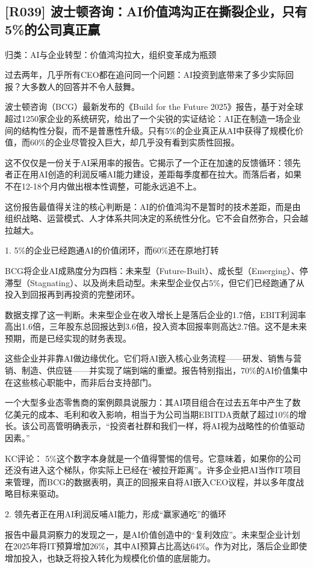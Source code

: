 \documentclass[11pt]{ctexart}
\begin{document}
\subsection{[R039] 波士顿咨询：AI价值鸿沟正在撕裂企业，只有5\%的公司真正赢}
{\small\color{refgray}归类：AI与企业转型：价值鸿沟拉大，组织变革成为瓶颈}

过去两年，几乎所有CEO都在追问同一个问题：AI投资到底带来了多少实际回报？大多数人的回答并不令人鼓舞。

波士顿咨询（BCG）最新发布的《Build for the Future 2025》报告，基于对全球超过1250家企业的系统研究，给出了一个尖锐的实证结论：AI正在制造一场企业间的结构性分裂，而不是普惠性升级。只有5\%的企业真正从AI中获得了规模化价值，而60\%的企业尽管投入巨大，却几乎没有看到实质性回报。

这不仅仅是一份关于AI采用率的报告。它揭示了一个正在加速的反馈循环：领先者正在用AI创造的利润反哺AI能力建设，差距每季度都在拉大。而落后者，如果不在12-18个月内做出根本性调整，可能永远追不上。

这份报告最值得关注的核心判断是：AI的价值鸿沟不是暂时的技术差距，而是由组织战略、运营模式、人才体系共同决定的系统性分化。它不会自然弥合，只会越拉越大。

1. 5\%的企业已经跑通AI的价值闭环，而60\%还在原地打转

BCG将企业AI成熟度分为四档：未来型（Future-Built）、成长型（Emerging）、停滞型（Stagnating）、以及尚未启动型。未来型企业仅占5\%，但它们已经跑通了从投入到回报再到再投资的完整闭环。

数据支撑了这一判断。未来型企业在收入增长上是落后企业的1.7倍，EBIT利润率高出1.6倍，三年股东总回报达到3.6倍，投入资本回报率则高达2.7倍。这不是未来预期，而是已经实现的财务表现。

这些企业并非靠AI做边缘优化。它们将AI嵌入核心业务流程——研发、销售与营销、制造、供应链——并实现了端到端的重塑。报告特别指出，70\%的AI价值集中在这些核心职能中，而非后台支持部门。

一个大型多业态零售商的案例颇具说服力：其AI项目组合在过去五年中产生了数亿美元的成本、毛利和收入影响，相当于为公司当期EBITDA贡献了超过10\%的增长。该公司高管明确表示，“投资者社群和我们一样，将AI视为战略性的价值驱动因素。”

KC评论： 5\%这个数字本身就是一个值得警惕的信号。它意味着，如果你的公司还没有进入这个梯队，你实际上已经在“被拉开距离”。许多企业把AI当作IT项目来管理，而BCG的数据表明，真正的回报来自将AI嵌入CEO议程，并以多年度战略目标来驱动。

2. 领先者正在用AI利润反哺AI能力，形成“赢家通吃”的循环

报告中最具洞察力的发现之一，是AI价值创造中的“复利效应”。未来型企业计划在2025年将IT预算增加26\%，其中AI预算占比高达64\%。作为对比，落后企业即使增加投入，也缺乏将投入转化为规模化价值的底层能力。
\end{document}
